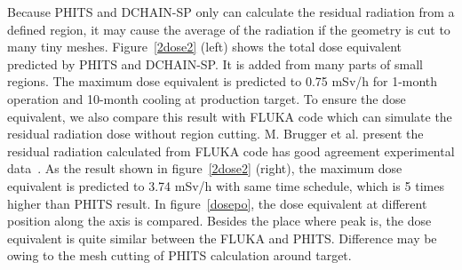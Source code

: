Because PHITS and DCHAIN-SP only can calculate the residual radiation from a defined region, it may cause the average of the radiation if the geometry is cut to many tiny meshes.
Figure~\ref{2dose2} (left) shows the total dose equivalent predicted by PHITS and DCHAIN-SP.
It is added from many parts of small regions.
The maximum dose equivalent is predicted to 0.75 mSv/h for 1-month operation and 10-month cooling at production target.
To ensure the dose equivalent, we also compare this result with FLUKA code which can simulate the residual radiation dose without region cutting.
M. Brugger et al. present the residual radiation calculated from FLUKA code has good agreement experimental data~\cite{brugger}.
As the result shown in figure~\ref{2dose2} (right), the maximum dose equivalent is predicted to 3.74 mSv/h with same time schedule, which is 5 times higher than PHITS result.
In figure~\ref{dosepo}, the dose equivalent at different position along the axis is compared.
Besides the place where peak is, the dose equivalent is quite similar between the FLUKA and PHITS.
Difference may be owing to the mesh cutting of PHITS calculation around target.
